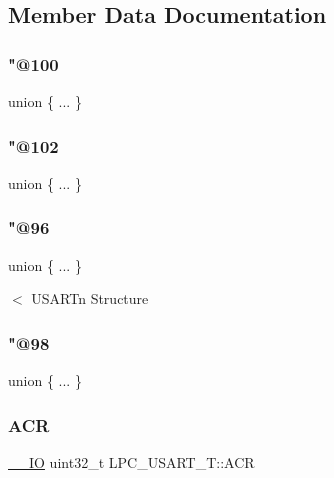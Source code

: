 \subsection{Member Data Documentation}
\mbox{\label{struct_l_p_c___u_s_a_r_t___t_a42d72c6ffc8cf715cc2e5b56119da0c4}} 
\subsubsection{\texorpdfstring{"@100}{@100}}
{\footnotesize\ttfamily union \{ ... \} }

\mbox{\label{struct_l_p_c___u_s_a_r_t___t_acc0fef84d5db12519e1b0bce5dd4a4ee}} 
\subsubsection{\texorpdfstring{"@102}{@102}}
{\footnotesize\ttfamily union \{ ... \} }

\mbox{\label{struct_l_p_c___u_s_a_r_t___t_ab5e184b063dc5bf88dfafbdd8a7590a1}} 
\subsubsection{\texorpdfstring{"@96}{@96}}
{\footnotesize\ttfamily union \{ ... \} }

$<$ U\+S\+A\+R\+Tn Structure \mbox{\label{struct_l_p_c___u_s_a_r_t___t_a99f0a7fe6ecce9ffd7287570957b90f9}} 
\subsubsection{\texorpdfstring{"@98}{@98}}
{\footnotesize\ttfamily union \{ ... \} }

\mbox{\label{struct_l_p_c___u_s_a_r_t___t_a443bb067899c7f269dc903a26522f44b}} 
\subsubsection{\texorpdfstring{A\+CR}{ACR}}
{\footnotesize\ttfamily \hyperlink{core__sc300_8h_aec43007d9998a0a0e01faede4133d6be}{\+\_\+\+\_\+\+IO} uint32\+\_\+t L\+P\+C\+\_\+\+U\+S\+A\+R\+T\+\_\+\+T\+::\+A\+CR}

